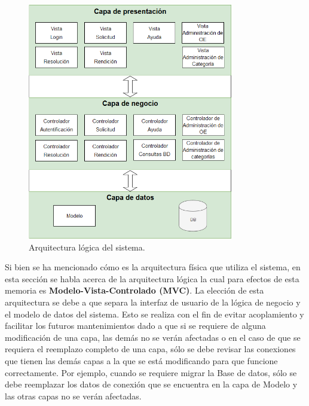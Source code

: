 \begin{figure}[htb]
    \hspace{12mm}
    \includegraphics[width=0.8\textwidth]{Imagenes/Arquitectura_logica.png}
    \caption{\label{fig: Arquitectura_Logica}Arquitectura lógica del sistema.}
\end{figure}

Si bien se ha mencionado cómo es la arquitectura física que utiliza el sistema, en esta sección se habla acerca de la arquitectura lógica la cual para efectos de esta memoria es \textbf{Modelo-Vista-Controlado (MVC)}. La elección de esta arquitectura se debe a que separa la interfaz de usuario de la lógica de negocio y el modelo de datos del sistema. Esto se realiza con el fin de evitar acoplamiento y facilitar los futuros mantenimientos dado a que si se requiere de alguna modificación de una capa, las demás no se verán afectadas o en el caso de que se requiera el reemplazo completo de una capa, sólo se debe revisar las conexiones que tienen las demás capas a la que se está modificando para que funcione correctamente. Por ejemplo, cuando se requiere migrar la Base de datos, sólo se debe reemplazar los datos de conexión que se encuentra en la capa de Modelo y las otras capas no se verán afectadas.

